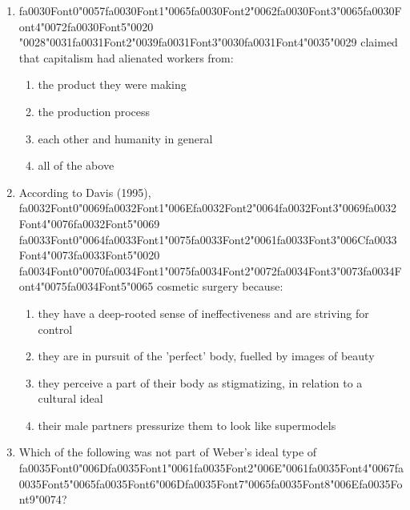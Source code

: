 \documentclass[12pt]{article}
\begin{document}
\begin{enumerate}[label=\arabic*.]
\begin{enumerate}[label=(\alph*)]
\end{enumerate}
\item {\csname fa0030Font0\endcsname\char"0057}{\csname fa0030Font1\endcsname\char"0065}{\csname fa0030Font2\endcsname\char"0062}{\csname fa0030Font3\endcsname\char"0065}{\csname fa0030Font4\endcsname\char"0072}{\csname fa0030Font5\endcsname\char"0020} {\char"0028}{\char"0031}{\csname fa0031Font2\endcsname\char"0039}{\csname fa0031Font3\endcsname\char"0030}{\csname fa0031Font4\endcsname\char"0035}{\char"0029} claimed that capitalism had alienated workers from:
\begin{enumerate}[label=(\alph*)]
    \item the product they were making
    \item the production process
    \item each other and humanity in general
    \item all of the above
\end{enumerate}
\item According to Davis (1995), {\csname fa0032Font0\endcsname\char"0069}{\csname fa0032Font1\endcsname\char"006E}{\csname fa0032Font2\endcsname\char"0064}{\csname fa0032Font3\endcsname\char"0069}{\csname fa0032Font4\endcsname\char"0076}{\csname fa0032Font5\endcsname\char"0069} {\csname fa0033Font0\endcsname\char"0064}{\csname fa0033Font1\endcsname\char"0075}{\csname fa0033Font2\endcsname\char"0061}{\csname fa0033Font3\endcsname\char"006C}{\csname fa0033Font4\endcsname\char"0073}{\csname fa0033Font5\endcsname\char"0020} {\csname fa0034Font0\endcsname\char"0070}{\csname fa0034Font1\endcsname\char"0075}{\csname fa0034Font2\endcsname\char"0072}{\csname fa0034Font3\endcsname\char"0073}{\csname fa0034Font4\endcsname\char"0075}{\csname fa0034Font5\endcsname\char"0065} cosmetic surgery because:
\begin{enumerate}[label=(\alph*)]
    \item they have a deep-rooted sense of ineffectiveness and are striving for control
    \item they are in pursuit of the 'perfect' body, fuelled by images of beauty
    \item they perceive a part of their body as stigmatizing, in relation to a cultural ideal
    \item their male partners pressurize them to look like supermodels
\end{enumerate}
\item Which of the following was not part of Weber's ideal type of {\csname fa0035Font0\endcsname\char"006D}{\csname fa0035Font1\endcsname\char"0061}{\csname fa0035Font2\endcsname\char"006E}{\char"0061}{\csname fa0035Font4\endcsname\char"0067}{\csname fa0035Font5\endcsname\char"0065}{\csname fa0035Font6\endcsname\char"006D}{\csname fa0035Font7\endcsname\char"0065}{\csname fa0035Font8\endcsname\char"006E}{\csname fa0035Font9\endcsname\char"0074}?

\end{enumerate}
\end{document}
